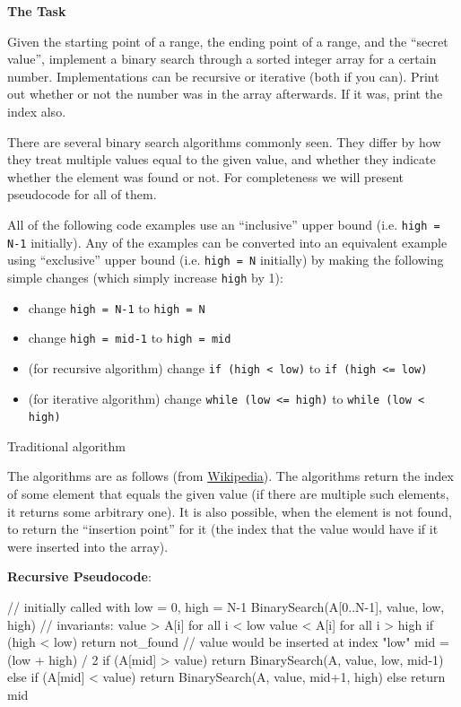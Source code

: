 \textbf{The Task}

Given the starting point of a range, the ending point of a range, and
the ``secret value'', implement a binary search through a sorted integer
array for a certain number. Implementations can be recursive or
iterative (both if you can). Print out whether or not the number was in
the array afterwards. If it was, print the index also.

There are several binary search algorithms commonly seen. They differ by
how they treat multiple values equal to the given value, and whether
they indicate whether the element was found or not. For completeness we
will present pseudocode for all of them.

All of the following code examples use an ``inclusive'' upper bound
(i.e. \texttt{high = N-1} initially). Any of the examples can be
converted into an equivalent example using ``exclusive'' upper bound
(i.e. \texttt{high = N} initially) by making the following simple
changes (which simply increase \texttt{high} by 1):

\begin{itemize}
\item
  change \texttt{high = N-1} to \texttt{high = N}
\item
  change \texttt{high = mid-1} to \texttt{high = mid}
\item
  (for recursive algorithm) change \texttt{if (high \textless{} low)} to
  \texttt{if (high \textless{}= low)}
\item
  (for iterative algorithm) change
  \texttt{while (low \textless{}= high)} to
  \texttt{while (low \textless{} high)}
\end{itemize}

Traditional algorithm

The algorithms are as follows (from
\href{http://en.wikipedia.org/wiki/Binary\_search}{Wikipedia}). The
algorithms return the index of some element that equals the given value
(if there are multiple such elements, it returns some arbitrary one). It
is also possible, when the element is not found, to return the
``insertion point'' for it (the index that the value would have if it
were inserted into the array).

\textbf{Recursive Pseudocode}:

\begin{wideverbatim}
  // initially called with low = 0, high = N-1
  BinarySearch(A[0..N-1], value, low, high) {
      // invariants: value > A[i] for all i < low
                     value < A[i] for all i > high
      if (high < low)
          return not_found // value would be inserted at index "low"
      mid = (low + high) / 2
      if (A[mid] > value)
          return BinarySearch(A, value, low, mid-1)
      else if (A[mid] < value)
          return BinarySearch(A, value, mid+1, high)
      else
          return mid
  }
\end{wideverbatim}

